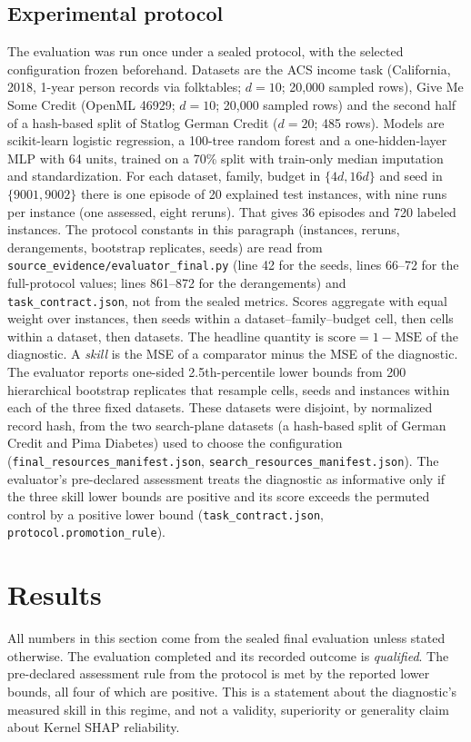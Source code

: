 \documentclass{article}
\begin{document}
\subsection{Experimental protocol}
The evaluation was run once under a sealed protocol, with the selected configuration frozen beforehand. Datasets are the ACS income task (California, 2018, 1-year person records via folktables; $d=10$; 20{,}000 sampled rows), Give Me Some Credit (OpenML 46929; $d=10$; 20{,}000 sampled rows) and the second half of a hash-based split of Statlog German Credit ($d=20$; 485 rows). Models are scikit-learn logistic regression, a 100-tree random forest and a one-hidden-layer MLP with 64 units, trained on a 70\% split with train-only median imputation and standardization. For each dataset, family, budget in $\{4d,16d\}$ and seed in $\{9001,9002\}$ there is one episode of 20 explained test instances, with nine runs per instance (one assessed, eight reruns). That gives 36 episodes and 720 labeled instances. The protocol constants in this paragraph (instances, reruns, derangements, bootstrap replicates, seeds) are read from \texttt{source\_evidence/evaluator\_final.py} (line 42 for the seeds, lines 66--72 for the full-protocol values; lines 861--872 for the derangements) and \texttt{task\_contract.json}, not from the sealed metrics. Scores aggregate with equal weight over instances, then seeds within a dataset--family--budget cell, then cells within a dataset, then datasets. The headline quantity is $\text{score}=1-\text{MSE}$ of the diagnostic. A \emph{skill} is the MSE of a comparator minus the MSE of the diagnostic. The evaluator reports one-sided 2.5th-percentile lower bounds from 200 hierarchical bootstrap replicates that resample cells, seeds and instances within each of the three fixed datasets. These datasets were disjoint, by normalized record hash, from the two search-plane datasets (a hash-based split of German Credit and Pima Diabetes) used to choose the configuration (\texttt{final\_resources\_manifest.json}, \texttt{search\_resources\_manifest.json}). The evaluator's pre-declared assessment treats the diagnostic as informative only if the three skill lower bounds are positive and its score exceeds the permuted control by a positive lower bound (\texttt{task\_contract.json}, \texttt{protocol.promotion\_rule}).

\section{Results}\label{sec:results}
All numbers in this section come from the sealed final evaluation unless stated otherwise. The evaluation completed and its recorded outcome is \emph{qualified}. The pre-declared assessment rule from the protocol is met by the reported lower bounds, all four of which are positive. This is a statement about the diagnostic's measured skill in this regime, and not a validity, superiority or generality claim about Kernel SHAP reliability.
\end{document}
